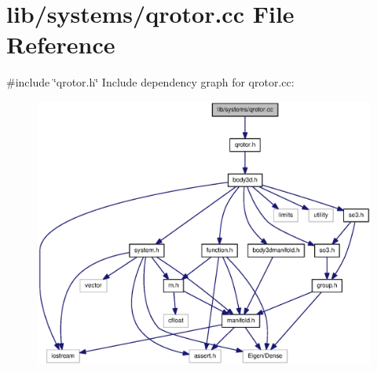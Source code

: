 \section{lib/systems/qrotor.cc \-File \-Reference}
\label{qrotor_8cc}
{\ttfamily \#include \char`\"{}qrotor.\-h\char`\"{}}\*
\-Include dependency graph for qrotor.\-cc\-:
\nopagebreak
\begin{figure}[H]
\begin{center}
\leavevmode
\includegraphics[width=350pt]{qrotor_8cc__incl}
\end{center}
\end{figure}
